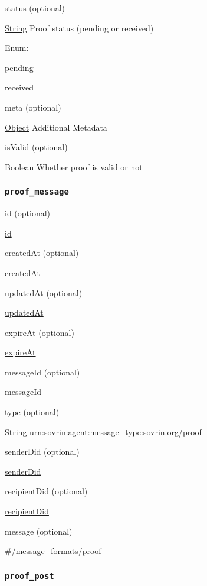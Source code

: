 status (optional)

{\protect\hyperlink{string}{String}} Proof status (pending or received)

Enum:

pending

received

meta (optional)

{\protect\hyperlink{object}{Object}} Additional Metadata

isValid (optional)

{\protect\hyperlink{boolean}{Boolean}} Whether proof is valid or not

\hypertarget{proof_message}{%
\subsubsection{\texorpdfstring{\protect\hypertarget{proof_message}{}{\texttt{proof\_message}}}{proof\_message}}\label{proof_message}}

id (optional)

{\protect\hyperlink{id}{id}}

createdAt (optional)

{\protect\hyperlink{createdAt}{createdAt}}

updatedAt (optional)

{\protect\hyperlink{updatedAt}{updatedAt}}

expireAt (optional)

{\protect\hyperlink{expireAt}{expireAt}}

messageId (optional)

{\protect\hyperlink{messageId}{messageId}}

type (optional)

{\protect\hyperlink{string}{String}}
urn:sovrin:agent:message\_type:sovrin.org/proof

senderDid (optional)

{\protect\hyperlink{senderDid}{senderDid}}

recipientDid (optional)

{\protect\hyperlink{recipientDid}{recipientDid}}

message (optional)

{\protect\hyperlink{ux5cux23ux2fmessage_formatsux2fproof}{\#/message\_formats/proof}}

\hypertarget{proof_post}{%
\subsubsection{\texorpdfstring{\protect\hypertarget{proof_post}{}{\texttt{proof\_post}}}{proof\_post}}\label{proof_post}}

